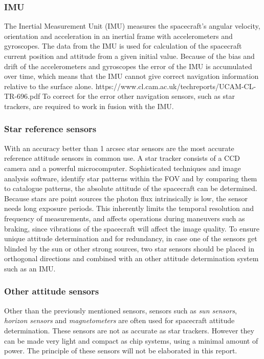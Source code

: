 \subsubsection{IMU}
The Inertial Measurement Unit (IMU) measures the spacecraft's angular velocity, orientation and acceleration in an inertial frame with accelerometers and gyroscopes. The data from the IMU is used for calculation of the spacecraft current position and attitude from a given initial value. Because of the bias and drift of the accelerometers and gyroscopes the error of the IMU is accumulated over time, which means that the IMU cannot give correct navigation information relative to the surface alone. https://www.cl.cam.ac.uk/techreports/UCAM-CL-TR-696.pdf 
To correct for the error other navigation sensors, such as star trackers, are required to work in fusion with the IMU. 



\subsubsection{Star reference sensors}
With an accuracy better than 1 arcsec star sensors are the most accurate reference attitude sensors in common use. \cite{space} A star tracker consists of a CCD camera and a powerful microcomputer. Sophisticated techniques and image analysis software, identify star patterns within the FOV and by comparing them to catalogue patterns, the absolute attitude of the spacecraft can be determined.  Because stars are point sources the photon flux intrinsically is low, the sensor needs long exposure periods. This inherently limits the temporal resolution and frequency of measurements, and affects operations during maneuvers such as braking, since vibrations of the spacecraft will affect the image quality. To ensure unique attitude determination and for redundancy, in case one of the sensors get blinded by the sun or other strong sources, two star sensors should be placed in orthogonal directions and combined with an other attitude determination system such as an IMU.

\subsubsection{Other attitude sensors}
Other than the previously mentioned sensors, sensors such as \textit{sun sensors}, \textit{horizon sensors} and \textit{magnetometers} are often used for spacecraft attitude determination. These sensors are not as accurate as star trackers. However they can be made very light and compact as chip systems, using a minimal amount of power. The principle of these sensors will not be elaborated in this report. 


